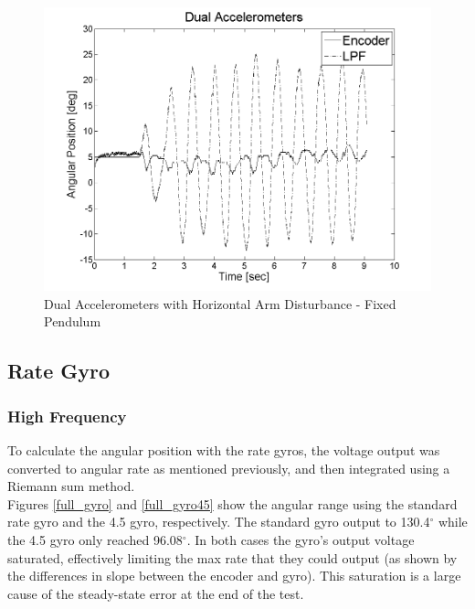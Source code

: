 \documentclass{article}
\theoremstyle{plain}
\theoremstyle{definition}
\theoremstyle{remark}
\begin{document}
\begin{figure}[hbt]
\begin{center}
\includegraphics[width = 12cm]{Dual_PendulumFixed_Dist.png}
\caption{Dual Accelerometers with Horizontal Arm Disturbance - Fixed Pendulum}
\label{Dual_PendulumFixed_Dist}
\end{center}
\end{figure}

\clearpage
\subsection{Rate Gyro}
\subsubsection{High Frequency}

To calculate the angular position with the rate gyros, the voltage output was converted to angular rate as mentioned previously, and then integrated using a Riemann sum method. \\

Figures \ref{full_gyro} and \ref{full_gyro45} show the angular range using the standard rate gyro and the 4.5 gyro, respectively. The standard gyro output to 130.4$^{\circ}$ while the 4.5 gyro only reached 96.08$^{\circ}$. In both cases the gyro's output voltage saturated, effectively limiting the max rate that they could output (as shown by the differences in slope between the encoder and gyro). This saturation is a large cause of the steady-state error at the end of the test.\\
\end{document}
